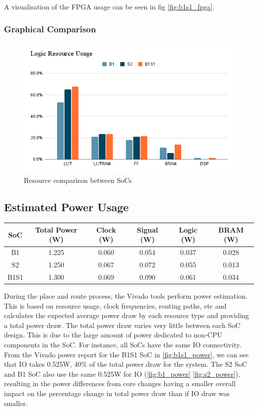 A visualisation of the FPGA usage can be seen in fig \ref{fig:b1s1_fpga}.

\subsubsection{Graphical Comparison}
\begin{figure}[h!]
    \centering
    \includegraphics[width=\textwidth]{img/Logic Resource Usage.png}
    \caption{Resource comparison between SoCs}
    \label{fig:resource_soc_comp}
\end{figure}

\subsection{Estimated Power Usage}
\begin{center}
\begin{tabular}{c c c c c c}
    SoC & Total Power (W) & Clock (W) & Signal (W) & Logic (W) & BRAM (W) \\
    \hline
    B1 & 1.225 & 0.060 & 0.054 & 0.037 & 0.028 \\
    \hline
    S2 & 1.250 & 0.067 & 0.072 & 0.055 & 0.013 \\
    \hline
    B1S1 & 1.300 & 0.069 & 0.090 & 0.061 & 0.034 \\
    \hline
\end{tabular}
\end{center}

During the place and route process, the Vivado tools perform power estimation. This is based on resource usage, clock frequencies, routing paths, etc and calculates the expected average power draw by each resource type and providing a total power draw. The total power draw varies very little between each SoC design. This is due to the large amount of power dedicated to non-CPU components in the SoC. For instance, all SoCs have the same IO connectivity. From the Vivado power report for the B1S1 SoC in \ref{fig:b1s1_power}, we can see that IO takes 0.525W, 40\% of the total power draw for the system. The S2 SoC and B1 SoC also use the same 0.525W for IO (\ref{fig:b1_power} \ref{fig:s2_power}), resulting in the power differences from core changes having a smaller overall impact on the percentage change in total power draw than if IO draw was smaller.


